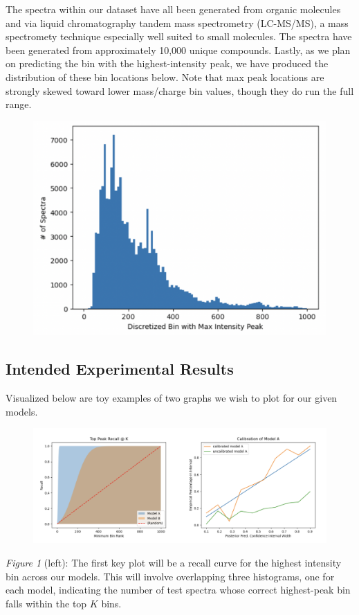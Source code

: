 \documentclass{article}
\begin{document}
The spectra within our dataset have all been generated from organic molecules and via liquid chromatography tandem mass spectrometry (LC-MS/MS), a mass spectromety technique especially well suited to small molecules. The spectra have been generated from approximately 10,000 unique compounds. Lastly, as we plan on predicting the bin with the highest-intensity peak, we have produced the distribution of these bin locations below. Note that max peak locations are strongly skewed toward lower mass/charge bin values, though they do run the full range.
\begin{figure}[H]
  \centering
  \centerline{\includegraphics[scale=0.35]{maxbin_hist.png}}
\end{figure}
\subsection{Intended Experimental Results}
Visualized below are toy examples of two graphs we wish to plot for our given models.
\begin{figure}[H]
  \centering
  \centerline{\includegraphics[scale=0.8]{two_plots.png}}
\end{figure}
\textit{Figure 1} (left): The first key plot will be a recall curve for the highest intensity bin across our models. This will involve overlapping three histograms, one for each model, indicating the number of test spectra whose correct highest-peak bin falls within the top $K$ bins.
\end{document}
